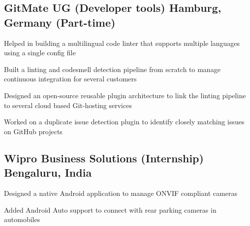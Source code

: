 \documentclass[letter,10pt]{article}
\begin{document}
\newpage


\subsection{GitMate UG (Developer tools) \hfill Hamburg, Germany (Part-time)}
\begin{zitemize}
    \item Helped in building a multilingual code linter that supports multiple languages
    using a single config file
    \item Built a linting and codesmell detection pipeline from scratch to manage
    continuous integration for several customers
    \item Designed an open-source reusable plugin architecture to link the linting
    pipeline to several cloud based Git-hosting services
    \item Worked on a duplicate issue detection plugin to identify closely matching
    issues on GitHub projects
\end{zitemize}


\subsection{Wipro Business Solutions (Internship) \hfill Bengaluru, India}
\begin{zitemize}
    \item Designed a native Android application to manage ONVIF compliant cameras
    \item Added Android Auto support to connect with rear parking cameras in automobiles
\end{zitemize}

\end{document}
